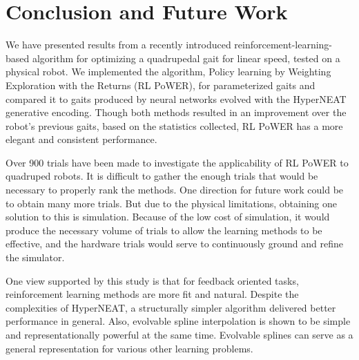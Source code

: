 \section{Conclusion and Future Work}

We have presented results from a recently introduced reinforcement-learning-based algorithm for
optimizing a quadrupedal gait for linear speed, tested on a physical robot.  We implemented the algorithm, Policy learning by Weighting
Exploration with the Returns (RL PoWER), for parameterized gaits and compared
it to gaits produced by neural networks evolved with the HyperNEAT
generative encoding. Though both methods resulted in an improvement
over the robot's previous \naive gaits, based on the statistics
collected, RL PoWER has a more elegant and consistent performance.

Over 900 trials have been made to investigate the applicability
of RL PoWER to quadruped robots. It is difficult to gather the enough
trials that would be necessary to properly rank the methods. One
direction for future work could be to obtain many more trials. But due
to the physical limitations, obtaining one solution to this is
simulation. Because of the low cost of simulation, it would produce
the necessary volume of trials to allow the learning methods to be
effective, and the hardware trials would serve to continuously ground
and refine the simulator. 

One view supported by this study is that for feedback oriented tasks,
reinforcement learning methods are more fit and natural. Despite the
complexities of HyperNEAT, a structurally simpler algorithm delivered better performance in general.  Also, evolvable spline
interpolation is shown to be simple and representationally powerful at
the same time. Evolvable splines can serve as a general representation for various other
learning problems. 
